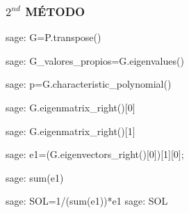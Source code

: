 \newpage    
\subsubsection*{$2^{nd}$ MÉTODO}
    
\begin{sagecommandline}
    sage: G=P.transpose()
\end{sagecommandline}
    
\begin{sagecommandline}
    sage: G_valores_propios=G.eigenvalues()
\end{sagecommandline}

\begin{sagecommandline}
    sage: p=G.characteristic_polynomial()
\end{sagecommandline}

\begin{sagecommandline}
    sage: G.eigenmatrix_right()[0]
\end{sagecommandline}

\begin{sagecommandline}
    sage: G.eigenmatrix_right()[1]
\end{sagecommandline}
    
\begin{sagecommandline}
    sage: e1=(G.eigenvectors_right()[0])[1][0];
\end{sagecommandline}
    
\begin{sagecommandline}
    sage: sum(e1)
\end{sagecommandline}
    
\begin{sagecommandline}
    sage: SOL=1/(sum(e1))*e1
    sage: SOL
\end{sagecommandline}